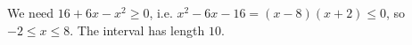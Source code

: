 We need $16+6x-x^2\ge0$, i.e. $x^2-6x-16=(x-8)(x+2)\le0$, so $-2\le x\le8$. The interval has length $\boxed{10}$.
